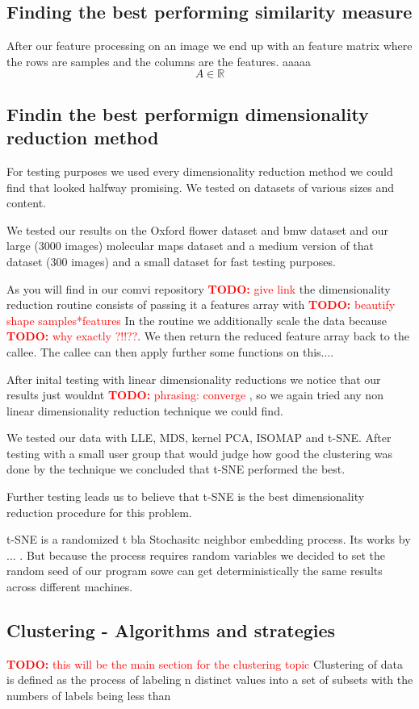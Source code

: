 \documentclass[journal]{vgtc}       %
\newcommand{\todo}[1]{\textcolor{red}{\textbf{TODO:} #1}}
\begin{document}
\subsection{Finding the best performing similarity measure}

After our feature processing on an image we end up with an feature matrix where the rows are samples  and the columns are the features. aaaaa \[A \in \mathbb{R}\]


\subsection{Findin the best performign dimensionality reduction method}
For testing purposes we used every dimensionality reduction method we could find that looked halfway promising. We tested on datasets of various sizes and content.

We tested our results on the Oxford flower dataset and bmw dataset and our large (3000 images) molecular maps dataset and a medium version of that dataset (300 images) and a small dataset for fast testing purposes.

As you will find in our comvi repository \todo{give link} the dimensionality reduction routine consists of passing it a features array with \todo{beautify shape samples*features}
In the routine we additionally scale the data because \todo{why exactly ?!!??}.
We then return the reduced feature array back to the callee. The callee can then apply further some functions on this....

After inital testing with linear dimensionality reductions we notice that our results just wouldnt \todo{phrasing: converge }, so we again tried any non linear dimensionality reduction technique we could find.

We tested our data with LLE, MDS, kernel PCA, ISOMAP and t-SNE.
After testing with a small user group that would judge how good the clustering was done by the technique we concluded that t-SNE performed the best.

Further testing leads us to believe that t-SNE is the best dimensionality reduction procedure for this problem.

t-SNE is a randomized t bla Stochasitc neighbor embedding process. Its works by ... . But because the process requires random variables we decided to set the random seed of our program sowe can get deterministically the same results across different machines.

\subsection{Clustering - Algorithms and strategies }
\todo{this will be the main section for the clustering topic }
Clustering of data is defined as the process of labeling n distinct values into a set of subsets with the numbers of labels being less than 
\end{document}
